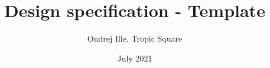 \documentclass{tropic_design_spec}
\title{Design specification - Template}
\author{Ondrej Ille, Tropic Square}
\date{July 2021}
\newcommand{\+}{\discretionary{\mbox{\scriptsize$\hookleftarrow$}}{}{}}
\begin{document}
\def \projectname {libtropic}
\def \documentname {C library for TROPIC devices}
\def \versionnumber {0.0.1}

\maketitle
\pagebreak

\tableofcontents
\pagebreak
\end{document}
